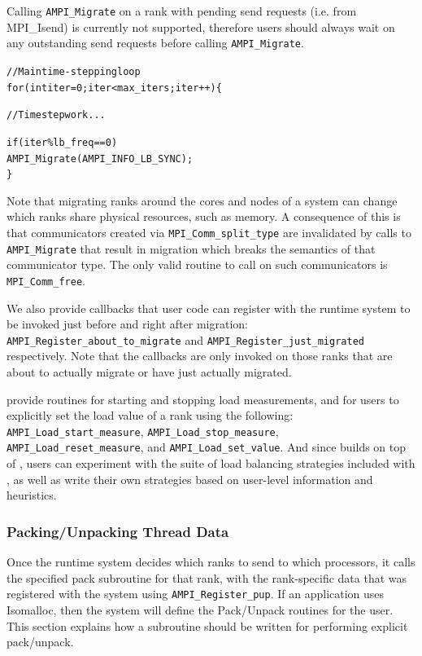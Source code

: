 \documentclass[10pt]{article}
\begin{document}
Calling \texttt{AMPI\_Migrate} on a rank with pending send requests (i.e. from MPI\_Isend)
is currently not supported, therefore users should always wait on any outstanding send requests
before calling \texttt{AMPI\_Migrate}.

\begin{alltt}
// Main time-stepping loop
for (int iter=0; iter < max_iters; iter++) \{

  // Time step work ...

  if (iter \% lb_freq == 0)
    AMPI_Migrate(AMPI_INFO_LB_SYNC);
\}
\end{alltt}

Note that migrating ranks around the cores and nodes of a system can change which
ranks share physical resources, such as memory. A consequence of this is that communicators created
via \texttt{MPI\_Comm\_split\_type} are invalidated by calls to \texttt{AMPI\_Migrate} that result
in migration which breaks the semantics of that communicator type. The only valid routine to call on
such communicators is \texttt{MPI\_Comm\_free}.

We also provide callbacks that user code can register with the runtime system
to be invoked just before and right after migration:
\texttt{AMPI\_Register\_about\_to\_migrate} and
\texttt{AMPI\_Register\_just\_migrated} respectively. Note that the callbacks
are only invoked on those ranks that are about to actually migrate or have
just actually migrated.

\ampi{} provide routines for starting and stopping load measurements, and for
users to explicitly set the load value of a rank using the following:
\texttt{AMPI\_Load\_start\_measure}, \texttt{AMPI\_Load\_stop\_measure},
\texttt{AMPI\_Load\_reset\_measure}, and \texttt{AMPI\_Load\_set\_value}.
And since \ampi{} builds on top of \charmpp{},
users can experiment with the suite of load balancing strategies included with
\charmpp{}, as well as write their own strategies based on user-level
information and heuristics.

\subsubsection{Packing/Unpacking Thread Data}

Once the \ampi{} runtime system decides which ranks to send to which
processors, it calls the specified pack subroutine for that rank, with the
rank-specific data that was registered with the system using
\texttt{AMPI\_Register\_pup}. If an \ampi{} application uses Isomalloc, then
the system will define the Pack/Unpack routines for the user. This section
explains how a subroutine should be written for performing explicit pack/unpack.
\end{document}
